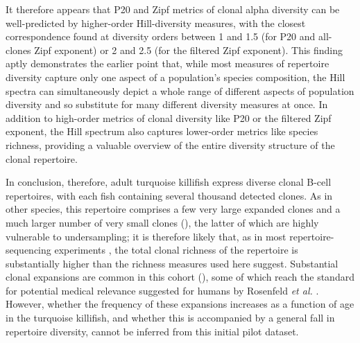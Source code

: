 It therefore appears that P20 and Zipf metrics of clonal alpha diversity can be well-predicted by higher-order Hill-diversity measures, with the closest correspondence found at diversity orders between 1 and 1.5 (for P20 and all-clones Zipf exponent) or 2 and 2.5 (for the filtered Zipf exponent). This finding aptly demonstrates the earlier point that, while most measures of repertoire diversity capture only one aspect of a population's species composition, the Hill spectra can simultaneously depict a whole range of different aspects of population diversity and so substitute for many different diversity measures at once. In addition to high-order metrics of clonal diversity like P20 or the filtered Zipf exponent, the Hill spectrum also captures lower-order metrics like species richness, providing a valuable overview of the entire diversity structure of the clonal repertoire.

In conclusion, therefore, adult turquoise killifish express diverse clonal B-cell repertoires, with each fish containing several thousand detected clones. As in other species, this repertoire comprises a few very large expanded clones and a much larger number of very small clones (), the latter of which are highly vulnerable to undersampling; it is therefore likely that, as in most repertoire-sequencing experiments \parencite{mora2016diversity}, the total clonal richness of the repertoire is substantially higher than the richness measures used here suggest. Substantial clonal expansions are common in this cohort (), some of which reach the standard for potential medical relevance suggested for humans by Rosenfeld \textit{et al.} \parencite{rosenfeld2018clonesize}. However, whether the frequency of these expansions increases as a function of age in the turquoise killifish, and whether this is accompanied by a general fall in repertoire diversity, cannot be inferred from this initial pilot dataset.

